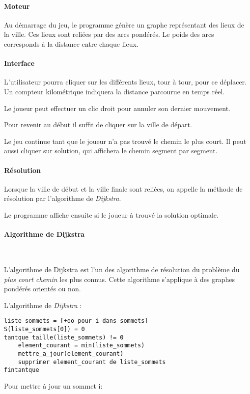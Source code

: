         \paragraph{Moteur}
            Au démarrage du jeu, le programme génère un graphe
            représentant des lieux de la ville. Ces lieux sont reliées par des arcs pondérés.
            Le poids des arcs corresponds à la distance entre chaque lieux.

        \paragraph{Interface}

        L'utilisateur pourra cliquer sur les différents lieux, tour à tour,
        pour ce déplacer. Un compteur kilométrique indiquera la
        distance parcourue en temps réel.

        Le joueur peut effectuer un clic droit pour annuler son dernier
        mouvement.

        Pour revenir au début il suffit de cliquer sur la ville de départ.

        Le jeu continue tant que le joueur n'a pas trouvé le chemin
        le plus court. Il peut aussi cliquer sur \og solution\fg, qui
        affichera le chemin segment par segment.



        \paragraph{Résolution}
            Lorsque la ville de début et la ville finale sont reliées,
            on appelle la méthode de résolution par l'algorithme de \emph{Dijkstra}.

            Le programme affiche ensuite si le joueur à trouvé la solution optimale.

		\paragraph{Algorithme de Dijkstra} ~

			L'algorithme de Dijkstra est l'un des algorithme de résolution du problème du
			\emph{plus court chemin} les plus connus. Cette algorithme s'applique à des graphes pondérés orientés ou non.

			L'algorithme de \emph{Dijkstra} :
			\begin{lstlisting}
liste_sommets = [+oo pour i dans sommets]
S(liste_sommets[0]) = 0
tantque taille(liste_sommets) != 0
    element_courant = min(liste_sommets)
    mettre_a_jour(element_courant)
    supprimer element_courant de liste_sommets
fintantque
			\end{lstlisting}
			Pour mettre à jour un sommet i:

